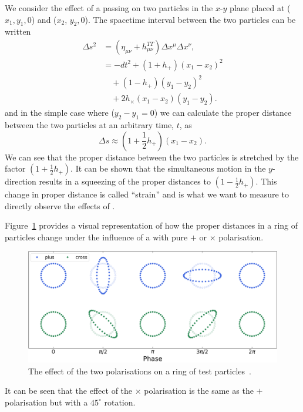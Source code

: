 We consider the effect of a passing \gw on two particles in the $x$-$y$ plane placed at ($x_{1}, y_{1}, 0$) and ($x_{2}$, $y_{2}, 0$). The spacetime interval between the two particles can be written
%
\begin{align}
    \Delta s^{2} &= \left(\eta_{\mu\nu} + h^{TT}_{\mu\nu}\right) \Delta x^{\mu} \Delta x^{\nu}, \\
    &= -dt^{2} + \left(1 + h_{+}\right)(x_{1} - x_{2})^{2} \nonumber \\
    &\quad + \left(1 - h_{+}\right)(y_{1} - y_{2})^{2} \nonumber \\
    &\quad + 2h_{\times} (x_{1} - x_{2})(y_{1} - y_{2}).
\end{align}
%
and in the simple case where ($y_{2} - y_{1} = 0$) we can calculate the proper distance between the two particles at an arbitrary time, $t$, as
%
\begin{equation}
    \Delta s \approx \left( 1 + \frac{1}{2} h_{+}\right)(x_{1} - x_{2}).
    \label{1:eq:proper_dist_two_particles}
\end{equation}
%
We can see that the proper distance between the two particles is stretched by the factor $(1 + \frac{1}{2}h_{+})$. It can be shown that the simultaneous motion in the $y$-direction results in a squeezing of the proper distances to $(1 - \frac{1}{2}h_{+})$. This change in proper distance is called \gwadj ``strain'' and is what we want to measure to directly observe the effects of \gws.

Figure~\ref{1:fig:ring_of_particles} provides a visual representation of how the proper distances in a ring of particles change under the influence of a \gw with pure $+$ or $\times$ polarisation.
%
\begin{figure}
   \includegraphics[width=\textwidth]{images/1_general_relativity/gravitational_radiation/polarisation.png}
   \caption{The effect of the two polarisations on a ring of test particles~\cite{gw_polarisation_plots}.}
   \label{1:fig:ring_of_particles}
\end{figure}
%
It can be seen that the effect of the $\times$ polarisation is the same as the $+$ polarisation but with a $45^{\circ}$ rotation.

